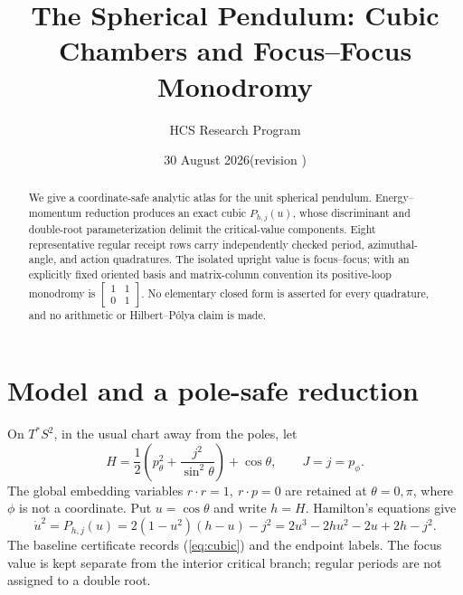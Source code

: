 \documentclass[10pt]{article}
\title{The Spherical Pendulum: Cubic Chambers and Focus--Focus Monodromy}
\author{HCS Research Program}
\date{30 August 2026\quad (revision \CRevisionRound)}
\begin{document}
\maketitle
\begin{abstract}
We give a coordinate-safe analytic atlas for the unit spherical pendulum.
Energy--momentum reduction produces an exact cubic \(P_{h,j}(u)\), whose
discriminant and double-root parameterization delimit the critical-value
components.  Eight representative regular receipt rows carry independently checked period,
azimuthal-angle, and action quadratures.  The isolated upright value is
focus--focus; with an explicitly fixed oriented basis and matrix-column
convention its positive-loop monodromy is
\(\left[\begin{smallmatrix}1&1\\0&1\end{smallmatrix}\right]\).
No elementary closed form is asserted for every quadrature, and no arithmetic
or Hilbert--Pólya claim is made.
\end{abstract}

\section{Model and a pole-safe reduction}
On \(T^*S^2\), in the usual chart away from the poles, let
\begin{equation}
 H=\frac12\left(p_\theta^2+\frac{j^2}{\sin^2\theta}\right)+\cos\theta,
 \qquad J=j=p_\phi .                                      \label{eq:H}
\end{equation}
The global embedding variables \(r\cdot r=1,\ r\cdot p=0\) are retained at
\(\theta=0,\pi\), where \(\phi\) is not a coordinate.  Put \(u=\cos\theta\)
and write \(h=H\).  Hamilton's equations give
\begin{equation}
 \dot u^2=P_{h,j}(u)=2(1-u^2)(h-u)-j^2
 =2u^3-2hu^2-2u+2h-j^2 .                                  \label{eq:cubic}
\end{equation}
\ifnum{}
The baseline certificate records (\ref{eq:cubic}) and the endpoint labels.
The focus value is kept separate from the interior critical branch; regular
periods are not assigned to a double root.
\fi
\end{document}
